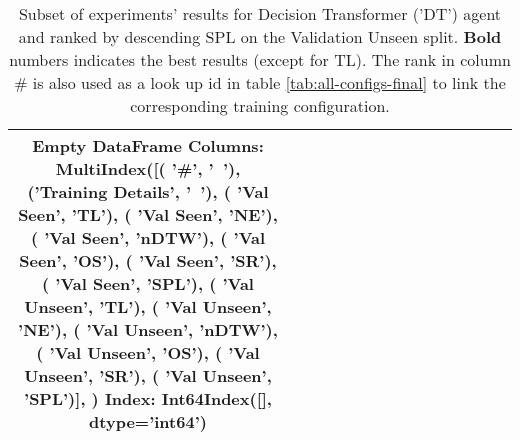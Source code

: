 \begin{table}
\centering
\caption{\label{tab:dt_full_dt_ablation_dim}Subset of experiments' results for Decision Transformer ('DT') agent and ranked by descending SPL on the Validation Unseen split. \textbf{Bold} numbers indicates the best results (except for TL). The rank in column \# is also used as a look up id in table \ref{tab:all-configs-final} to link the corresponding training configuration.}
\begin{tabular}{@{\hskip3pt}c@{\hskip3pt}c@{\hskip3pt}c@{\hskip3pt}c@{\hskip3pt}c@{\hskip3pt}c@{\hskip3pt}c@{\hskip3pt}c@{\hskip3pt}c@{\hskip3pt}c@{\hskip3pt}c@{\hskip3pt}c@{\hskip3pt}c@{\hskip3pt}c@{\hskip3pt}c}
\toprule
Empty DataFrame
Columns: MultiIndex([(              '\textbf{\#}',    '\textbf{~}'),
            ('\textbf{Training Details}',    '\textbf{~}'),
            (        '\textbf{Val Seen}',   '\textbf{TL}'),
            (        '\textbf{Val Seen}',   '\textbf{NE}'),
            (        '\textbf{Val Seen}', '\textbf{nDTW}'),
            (        '\textbf{Val Seen}',   '\textbf{OS}'),
            (        '\textbf{Val Seen}',   '\textbf{SR}'),
            (        '\textbf{Val Seen}',  '\textbf{SPL}'),
            (      '\textbf{Val Unseen}',   '\textbf{TL}'),
            (      '\textbf{Val Unseen}',   '\textbf{NE}'),
            (      '\textbf{Val Unseen}', '\textbf{nDTW}'),
            (      '\textbf{Val Unseen}',   '\textbf{OS}'),
            (      '\textbf{Val Unseen}',   '\textbf{SR}'),
            (      '\textbf{Val Unseen}',  '\textbf{SPL}')],
           )
Index: Int64Index([], dtype='int64') \\
\bottomrule
\end{tabular}
\end{table}
